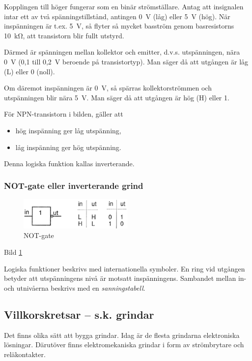 Kopplingen till höger fungerar som en binär strömställare. Antag att insignalen
intar ett av två spänningstillstånd, antingen 0~V (låg) eller 5~V (hög). När
inspänningen är t.ex. 5~V, så flyter så mycket basström genom basresistorns
10~kΩ, att transistorn blir fullt utstyrd.

Därmed är spänningen mellan kollektor och emitter, d.v.s. utspänningen, nära 0~V
(0,1 till 0,2~V beroende på transistortyp). Man säger då att utgången är låg (L)
eller 0 (noll).

Om däremot inspänningen är 0~V, så spärras kollektorströmmen och utspänningen
blir nära 5~V. Man säger då att utgången är hög (H) eller 1.

För NPN-transistorn i bilden, gäller att
\begin{itemize}
\item hög inspänning ger låg utspänning,
\item låg inspänning ger hög utspänning.
\end{itemize}
Denna logiska funktion kallas inverterande.

\subsubsection{NOT-gate eller inverterande grind}

\begin{figure}
\includegraphics[width=0.5\textwidth]{images/cropped_pdfs/bild_2_2-36.pdf}
\caption{NOT-gate}
\label{fig:BildII2-36}
\end{figure}

Bild \ref{fig:BildII2-36}

Logiska funktioner beskrivs med internationella symboler. En ring vid utgången
betyder att utspänningens nivå är motsatt inspänningens. Sambandet mellan in-
och utnivåerna beskrivs med en \emph{sanningstabell}.

\subsection{Villkorskretsar -- s.k. grindar}

Det finns olika sätt att bygga grindar. Idag är de flesta grindarna elektroniska
lösningar. Därutöver finns elektromekaniska grindar i form av strömbrytare och
reläkontakter.

